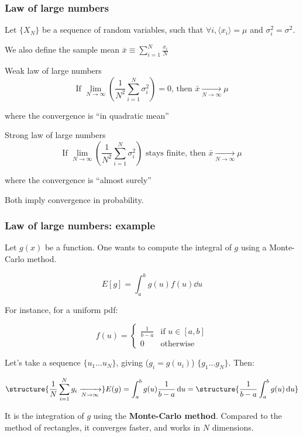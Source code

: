 \documentclass[9pt]{beamer}
\begin{document}
\begin{frame}
 \frametitle{Law of large numbers}
 
 Let $\{X_N\}$ be a sequence of random variables, such that $\forall i, \langle x_i \rangle = \mu$ and $\sigma^2_i = \sigma^2$. 
 
 We also define the sample mean
 $\bar{x} \equiv \sum_{i=1}^N \frac{x_i}{N}$
 
 \begin{block}{Weak law of large numbers}
  $$\text{If } \lim_{N \to \infty} \left( \frac{1}{N^2} \sum_{i=1}^N \sigma^2_i\right) = 0\text{, then } \bar{x} \xrightarrow[N \to \infty]{} \mu$$
  
  where the convergence is ``in quadratic mean''
 \end{block}
 
 \begin{block}{Strong law of large numbers}
  $$\text{If } \lim_{N \to \infty} \left( \frac{1}{N^2} \sum_{i=1}^N \sigma^2_i\right)\text{ stays finite, then } \bar{x} \xrightarrow[N \to \infty]{} \mu$$
  
  where the convergence is ``almost surely''
 \end{block}
 
 Both imply convergence in probability.

\end{frame}

\begin{frame}
 \frametitle{Law of large numbers: example}
 
 Let $g(x)$ be a function. One wants to compute the integral of $g$ using a Monte-Carlo method.
 
 $$E[g] = \int_a^b g(u) f(u) \dd u$$
 
 For instance, for a uniform pdf: 
 
 $$f(u) = 
 \begin{cases} 
      \frac{1}{b-a} & \text{if } u \in [a,b] \\ 
      0 & \text{otherwise}
   \end{cases}
$$

Let's take a sequence $\{ u_1 \dots u_N\}$, giving ($g_i = g(u_i)$) $\{ g_1 \dots g_N\}$. Then:

$$\structure{\frac{1}{N} \sum_{i=1}^N g_i \xrightarrow[N \to \infty]{}} E(g) = \int_a^b g(u) \frac{1}{b-a} \dd u = \structure{\frac{1}{b-a} \int_a^b g(u) \dd u}$$

It is the integration of $g$ using the \textbf{Monte-Carlo method}. Compared to the method of rectangles, it converges faster, and works in $N$ dimensions.
\end{frame}
\end{document}
